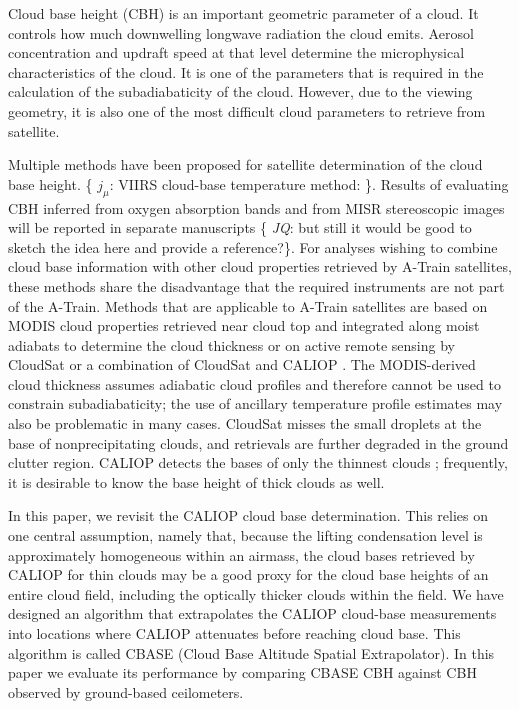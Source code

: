 \documentclass[essd,manuscript]{copernicus}\usepackage[]{graphicx}\usepackage[]{color}
\newcommand{\hlnum}[1]{\textcolor[rgb]{0.686,0.059,0.569}{#1}}%
\newcommand\comment[2]{\{\hlnum{ \textit{#1}: #2}\}}
\newcommand\commentjm[1]{\comment{$j_\mu$}{#1}}
\begin{document}
\introduction  %
\label{sec:intro}
Cloud base height (CBH) is an important geometric parameter of a cloud.  It controls
how much downwelling longwave radiation the cloud emits.  Aerosol concentration
and updraft speed at that level determine the microphysical characteristics of the cloud.  It is
one of the parameters that is required in the calculation of the subadiabaticity
of the cloud.  However, due to the viewing geometry, it is also one of the most
difficult cloud parameters to retrieve from satellite.  

Multiple methods have been proposed for satellite determination of the cloud
base height.  \commentjm{VIIRS cloud-base temperature method: \cite{zhu14}}.  Results of
evaluating CBH inferred from oxygen absorption bands and from MISR stereoscopic
images will be reported in separate manuscripts \comment{JQ}{but still it would be good to sketch the idea
here and provide a reference?}.  For analyses wishing to
combine cloud base information with other cloud properties retrieved by A-Train
satellites, these methods share the disadvantage that the required instruments
are not part of the A-Train.  Methods that are applicable to A-Train satellites
are based on MODIS cloud properties retrieved near cloud top and integrated
along moist adiabats to determine the cloud thickness \citep{meerkoetter07} or
on active remote sensing by CloudSat \citep[2B-GEOPROF][]{marchand08} or a
combination of CloudSat and CALIOP \citep[2B-GEOPROF-LIDAR][]{mace14}.  The
MODIS-derived cloud thickness assumes adiabatic cloud profiles and therefore
cannot be used to constrain subadiabaticity; the use of ancillary temperature profile
estimates may also be
problematic in many cases.  CloudSat misses the small droplets
at the base of nonprecipitating clouds, and retrievals are further degraded in
the ground clutter region.  CALIOP detects the bases of only the thinnest clouds
\citep[$\tau < 5$][]{mace14}; frequently, it is desirable to know the base
height of thick clouds as well.

In this paper, we revisit the CALIOP cloud base determination.  This relies on
one central assumption, namely that, because the
lifting condensation level is approximately homogeneous within an airmass, the
cloud bases retrieved by CALIOP for thin clouds may be a good proxy for the cloud
base heights of an entire cloud field, including the optically thicker clouds
within the field.  
We have designed an algorithm that extrapolates the CALIOP
cloud-base measurements into locations where CALIOP attenuates before reaching
cloud base.  This algorithm is called CBASE (Cloud Base Altitude Spatial
Extrapolator).  In this paper we evaluate its performance by comparing CBASE
CBH against CBH observed by ground-based
ceilometers.
\end{document}

